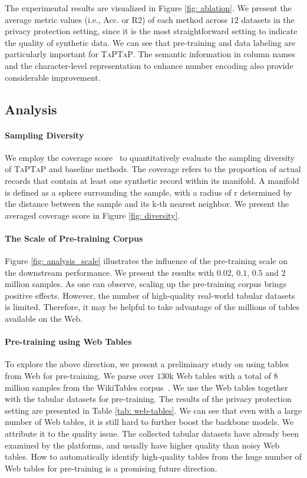 The experimental results are visualized in Figure \ref{fig: ablation}. We present the average metric values (i.e., Acc. or R2) of each method across $12$ datasets in the privacy protection setting, since it is the most straightforward setting to indicate the quality of synthetic data. We can see that pre-training and data labeling are particularly important for \textsc{TaPTaP}. The semantic information in column names and the character-level representation to enhance number encoding also provide considerable improvement.

\subsection{Analysis}

\paragraph{Sampling Diversity} We employ the coverage score~\cite{DBLP:conf/icml/coverage} to quantitatively evaluate the sampling diversity of \textsc{TaPTaP} and baseline methods. The coverage refers to the proportion of actual records that contain at least one synthetic record within its manifold. A manifold is defined as a sphere surrounding the sample, with a radius of r determined by the distance between the sample and its k-th nearest neighbor. We present the averaged coverage score in Figure \ref{fig: diversity}.

\paragraph{The Scale of Pre-training Corpus} Figure \ref{fig: analysis_scale} illustrates the influence of the pre-training scale on the downstream performance. We present the results with $0.02$, $0.1$, $0.5$ and $2$ million samples. As one can observe, scaling up the pre-training corpus brings positive effects. However, the number of high-quality real-world tabular datasets is limited. Therefore, it may be helpful to take advantage of the millions of tables available on the Web.

\paragraph{Pre-training using Web Tables}

To explore the above direction, we present a preliminary study on using tables from Web for pre-training. We parse over $130$k Web tables with a total of $8$ million samples from the WikiTables corpus~\citep{DBLP:conf/semweb/BhagavatulaND15}. We use the Web tables together with the tabular datasets for pre-training. The results of the privacy protection setting are presented in Table \ref{tab: web-tables}. We can see that even with a large number of Web tables, it is still hard to further boost the backbone models. We attribute it to the quality issue. The collected tabular datasets have already been examined by the platforms, and usually have higher quality than noisy Web tables. How to automatically identify high-quality tables from the huge number of Web tables for pre-training is a promising future direction.

